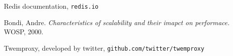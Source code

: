 \documentclass[11pt]{article}
\begin{document}
\pagebreak
\begin{thebibliography}{9}

Redis documentation,
\texttt{redis.io}
        
Bondi, Andre.
\textit{Characteristics of scalability and their imapct on performace.}
WOSP, 2000.

Twemproxy, developed by twitter,
\texttt{github.com/twitter/twemproxy}

\end{thebibliography}
\end{document}
